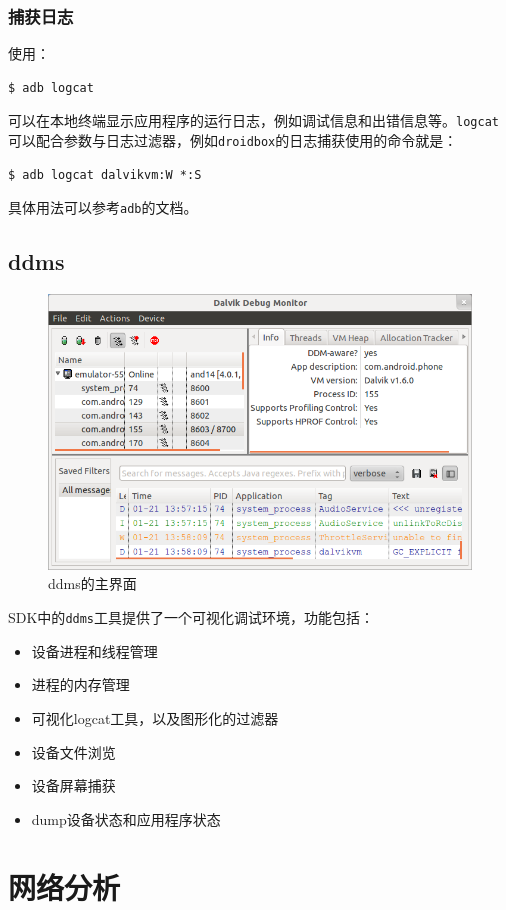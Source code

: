 \subsubsection{捕获日志}
使用：
\begin{lstlisting}[numbers=none]
 $ adb logcat
\end{lstlisting}
可以在本地终端显示应用程序的运行日志，例如调试信息和出错信息等。\lstinline!logcat!可以配合参数与日志过滤器，例如\lstinline!droidbox!的日志捕获使用的命令就是：
\begin{lstlisting}[numbers=none]
 $ adb logcat dalvikvm:W *:S
\end{lstlisting}
具体用法可以参考\lstinline!adb!的文档。

\subsection{ddms}
\begin{figure}[htbp]
  \centering
  \includegraphics[width=14cm]{image/ddms.png}
  \caption{ddms的主界面}
\end{figure}
SDK中的\lstinline!ddms!工具提供了一个可视化调试环境，功能包括：
\begin{itemize}
  \item 设备进程和线程管理
  \item 进程的内存管理
  \item 可视化logcat工具，以及图形化的过滤器
  \item 设备文件浏览
  \item 设备屏幕捕获
  \item dump设备状态和应用程序状态
\end{itemize}

\section{网络分析}
